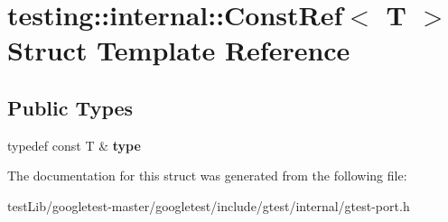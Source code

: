 \hypertarget{structtesting_1_1internal_1_1ConstRef}{}\section{testing\+:\+:internal\+:\+:Const\+Ref$<$ T $>$ Struct Template Reference}
\label{structtesting_1_1internal_1_1ConstRef}
\subsection*{Public Types}
\begin{DoxyCompactItemize}
\item 
\mbox{\label{structtesting_1_1internal_1_1ConstRef_a53610a4d0e72958332222b0a85f8937a}} 
typedef const T \& {\bfseries type}
\end{DoxyCompactItemize}


The documentation for this struct was generated from the following file\+:\begin{DoxyCompactItemize}
\item 
test\+Lib/googletest-\/master/googletest/include/gtest/internal/gtest-\/port.\+h\end{DoxyCompactItemize}
